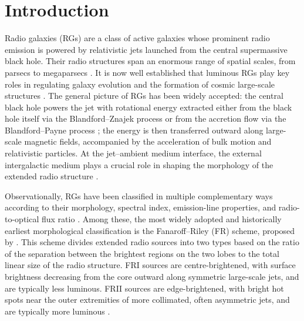\documentclass{aa}
\begin{document}
   \maketitle

   
\section{Introduction}\label{sec:Introduction}
Radio galaxies (RGs) are a class of active galaxies whose prominent radio emission is powered by relativistic jets launched from the central supermassive black hole. Their radio structures span an enormous range of spatial scales, from parsecs to megaparsecs \citep{hardcastle_radio_2020}. It is now well established that luminous RGs play key roles in regulating galaxy evolution and the formation of cosmic large-scale structures \citep{miley_distant_2008}. The general picture of RGs has been widely accepted: the central black hole powers the jet with rotational energy extracted either from the black hole itself via the Blandford–Znajek process or from the accretion flow via the Blandford–Payne process \citep{BZ77,BP82}; the energy is then transferred outward along large-scale magnetic fields, accompanied by the acceleration of bulk motion and relativistic particles. At the jet–ambient medium interface, the external intergalactic medium plays a crucial role in shaping the morphology of the extended radio structure \citep[e.g.,][and references therein]{BlandfordRees1978,ghisellini_bulk_1989,blandford_relativistic_2019}.

Observationally, RGs have been classified in multiple complementary ways according to their morphology, spectral index, emission-line properties, and radio-to-optical flux ratio \citep[e.g.,][]{fanaroff_morphology_1974,osterbrock_broad_1975,heckman_optical_1980,veilleux_spectral_1987,owen_ccd_1989,kellermann_radio_1989}. Among these, the most widely adopted and historically earliest morphological classification is the Fanaroff–Riley (FR) scheme, proposed by \citet{fanaroff_morphology_1974}. This scheme divides extended radio sources into two types based on the ratio 
of the separation between the brightest regions on the two lobes to the total linear size of the radio structure. FRI sources are centre-brightened, with surface brightness decreasing from the core outward along symmetric large-scale jets, and are typically less luminous. FRII sources are edge-brightened, with bright hot spots near the outer extremities of more collimated, often asymmetric jets, and are typically more luminous \citep{ledlow_20cm_1996}.
\end{document}
